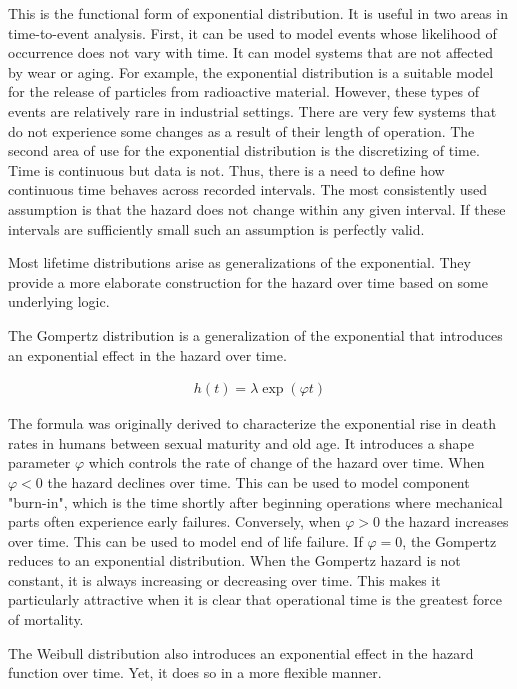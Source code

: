 This is the functional form of exponential distribution. It is useful in two areas in time-to-event analysis. First, it can be used to model events whose likelihood of occurrence does not vary with time. It can model systems that are not affected by wear or aging. For example, the exponential distribution is a suitable model for the release of particles from radioactive material\cite{Jowett1958}. However, these types of events are relatively rare in industrial settings. There are very few systems that do not experience some changes as a result of their length of operation. The second area of use for the exponential distribution is the discretizing of time. Time is continuous but data is not. Thus, there is a need to define how continuous time behaves across recorded intervals. The most consistently used assumption is that the hazard does not change within any given interval. If these intervals are sufficiently small such an assumption is perfectly valid.

Most lifetime distributions arise as generalizations of the exponential. They provide a more elaborate construction for the hazard over time based on some underlying logic.

The Gompertz distribution is a generalization of the exponential that introduces an exponential effect in the hazard over time.

\begin{align*}
h(t) = \lambda \exp(\varphi t) \tag{ $\lambda > 0, \varphi \in (-\infty, \infty) $}
\end{align*}

The formula was originally derived to characterize the exponential rise in death rates in humans between sexual maturity and old age\cite{Wienke2010}. It introduces a shape parameter $\varphi$ which controls the rate of change of the hazard over time. When $\varphi < 0$ the hazard declines over time. This can be used to model component "burn-in", which is the time shortly after beginning operations where mechanical parts often experience early failures. Conversely, when $\varphi > 0$ the hazard increases over time. This can be used to model end of life failure. If $\varphi = 0$, the Gompertz reduces to an exponential distribution. When the Gompertz hazard is not constant, it is always increasing or decreasing over time. This makes it particularly attractive when it is clear that operational time is the greatest force of mortality.

The Weibull distribution also introduces an exponential effect in the hazard function over time. Yet, it does so in a more flexible manner.

